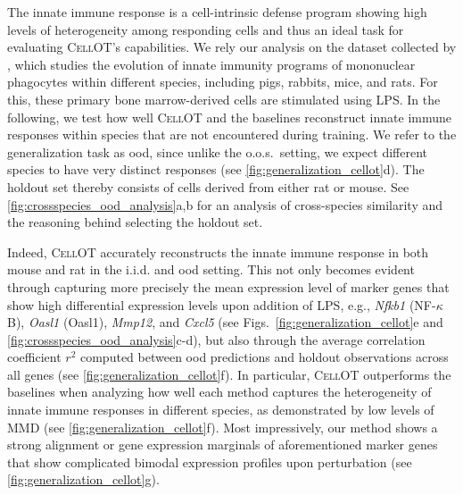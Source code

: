 The innate immune response is a cell-intrinsic defense program showing high levels of heterogeneity among responding cells and thus an ideal task for evaluating \textsc{CellOT}'s capabilities. We rely our analysis on the dataset collected by \citet{hagai2018gene}, which studies the evolution of innate immunity programs of mononuclear phagocytes within different species, including pigs, rabbits, mice, and rats. For this, these primary bone marrow-derived cells are stimulated using \acrshort{LPS}.
In the following, we test how well \textsc{CellOT} and the baselines reconstruct innate immune responses within species that are not encountered during training. We refer to the generalization task as \acrfull{ood}, since unlike the o.o.s.~setting, we expect different species to have very distinct responses (see \cref{fig:generalization_cellot}d).
The holdout set thereby consists of cells derived from either rat or mouse. See \cref{fig:crossspecies_ood_analysis}a,b for an analysis of cross-species similarity and the reasoning behind selecting the holdout set.

Indeed, \textsc{CellOT} accurately reconstructs the innate immune response in both mouse and rat in the i.i.d. and \acrshort{ood} setting. This not only becomes evident through capturing more precisely the mean expression level of marker genes that show high differential expression levels upon addition of \acrshort{LPS}, e.g., \textit{Nfkb1} (NF-$\kappa$B), \textit{Oasl1} (Oasl1), \textit{Mmp12}, and \textit{Cxcl5} (see Figs.~\ref{fig:generalization_cellot}e and \ref{fig:crossspecies_ood_analysis}c-d), but also through the average correlation coefficient $r^2$ computed between \acrshort{ood} predictions and holdout observations across all genes (see \cref{fig:generalization_cellot}f).
In particular, \textsc{CellOT} outperforms the baselines when analyzing how well each method captures the heterogeneity of innate immune responses in different species, as demonstrated by low levels of \acrshort{MMD} (see \cref{fig:generalization_cellot}f).
Most impressively, our method shows a strong alignment or gene expression marginals of aforementioned marker genes that show complicated bimodal expression profiles upon perturbation (see \cref{fig:generalization_cellot}g).

